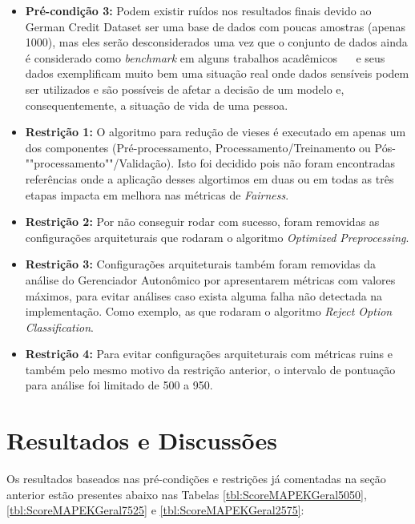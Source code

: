 \documentclass[portugues]{ic-tese}
\begin{document}
\begin{itemize}
\item \textbf{Pré-condição 3:} Podem existir ruídos nos resultados finais devido ao German Credit Dataset ser uma base de dados com poucas amostras (apenas 1000), mas eles serão desconsiderados uma vez que o conjunto de dados ainda é considerado como \textit{benchmark} em alguns trabalhos acadêmicos \citep{Kamiran_2011}~\citep{Feldman_2015}~\citep{Celis_2019} e seus dados exemplificam muito bem uma situação real onde dados sensíveis podem ser utilizados e são possíveis de afetar a decisão de um modelo e, consequentemente, a situação de vida de uma pessoa.

\item \textbf{Restrição 1:} O algoritmo para redução de vieses é executado em apenas um dos componentes (Pré-processamento, Processamento/Treinamento ou Pós-""processamento""/Validação). Isto foi decidido pois não foram encontradas referências onde a aplicação desses algortimos em duas ou em todas as três etapas impacta em melhora nas métricas de \textit{Fairness}.

\item \textbf{Restrição 2:} Por não conseguir rodar com sucesso, foram removidas as configurações arquiteturais que rodaram o algoritmo \textit{Optimized Preprocessing}.

\item \textbf{Restrição 3:} Configurações arquiteturais também foram removidas da análise do Gerenciador Autonômico por apresentarem métricas com valores máximos, para evitar análises caso exista alguma falha não detectada na implementação. Como exemplo, as que rodaram o algoritmo \textit{Reject Option Classification}.

\item \textbf{Restrição 4:} Para evitar configurações arquiteturais com métricas ruins e também pelo mesmo motivo da restrição anterior, o intervalo de pontuação para análise foi limitado de 500 a 950.
\end{itemize}

\section{Resultados e Discussões}

Os resultados baseados nas pré-condições e restrições já comentadas na seção anterior estão presentes abaixo nas Tabelas \ref{tbl:ScoreMAPEKGeral5050}, \ref{tbl:ScoreMAPEKGeral7525} e \ref{tbl:ScoreMAPEKGeral2575}:
\end{document}
